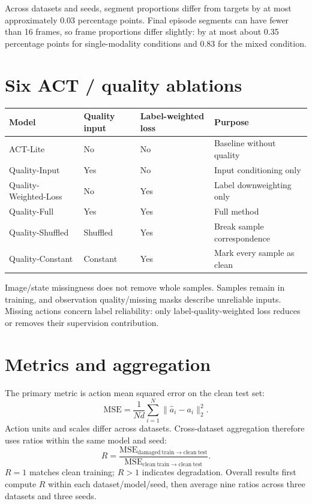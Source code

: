 \documentclass[11pt,a4paper]{article}
\begin{document}
Across datasets and seeds, segment proportions differ from targets by at most approximately 0.03 percentage points. Final episode segments can have fewer than 16 frames, so frame proportions differ slightly: by at most about 0.35 percentage points for single-modality conditions and 0.83 for the mixed condition.

\section{Six ACT / quality ablations}

\begin{table}[htbp]
\centering
\small
\begin{tabularx}{\linewidth}{p{38mm} C{24mm} C{26mm} Y}
\toprule
Model & Quality input & Label-weighted loss & Purpose\\
\midrule
ACT-Lite & No & No & Baseline without quality\\
Quality-Input & Yes & No & Input conditioning only\\
Quality-Weighted-Loss & No & Yes & Label downweighting only\\
Quality-Full & Yes & Yes & Full method\\
Quality-Shuffled & Shuffled & Yes & Break sample correspondence\\
Quality-Constant & Constant & Yes & Mark every sample as clean\\
\bottomrule
\end{tabularx}
\end{table}

Image/state missingness does not remove whole samples. Samples remain in training, and observation quality/missing masks describe unreliable inputs. Missing actions concern label reliability: only label-quality-weighted loss reduces or removes their supervision contribution.

\section{Metrics and aggregation}

The primary metric is action mean squared error on the clean test set:
\[
\mathrm{MSE}=\frac{1}{N d}\sum_{i=1}^{N}\lVert\hat{a}_i-a_i\rVert_2^2.
\]
Action units and scales differ across datasets. Cross-dataset aggregation therefore uses ratios within the same model and seed:
\[
R=\frac{\mathrm{MSE}_{\mathrm{damaged\ train}\rightarrow\mathrm{clean\ test}}}
{\mathrm{MSE}_{\mathrm{clean\ train}\rightarrow\mathrm{clean\ test}}}.
\]
$R=1$ matches clean training; $R>1$ indicates degradation. Overall results first compute $R$ within each dataset/model/seed, then average nine ratios across three datasets and three seeds.
\end{document}
